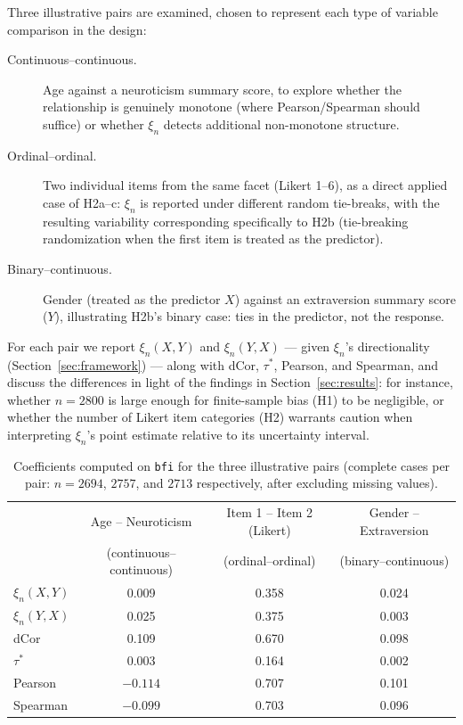 \documentclass[article]{ajs}
\begin{document}
Three illustrative pairs are examined, chosen to represent each type
of variable comparison in the design:

\begin{description}
\item[Continuous--continuous.] Age against a neuroticism summary
  score, to explore whether the relationship is genuinely monotone
  (where Pearson/Spearman should suffice) or whether $\xi_n$ detects
  additional non-monotone structure.
\item[Ordinal--ordinal.] Two individual items from the same facet
  (Likert 1--6), as a direct applied case of H2a--c: $\xi_n$ is
  reported under different random tie-breaks, with the resulting
  variability corresponding specifically to H2b (tie-breaking
  randomization when the first item is treated as the predictor).
\item[Binary--continuous.] Gender (treated as the predictor $X$)
  against an extraversion summary score ($Y$), illustrating H2b's
  binary case: ties in the predictor, not the response.
\end{description}

For each pair we report $\xi_n(X,Y)$ and $\xi_n(Y,X)$ --- given
$\xi_n$'s directionality (Section~\ref{sec:framework}) --- along with
dCor, $\tau^\ast$, Pearson, and Spearman, and discuss the differences
in light of the findings in Section~\ref{sec:results}: for instance,
whether $n=2800$ is large enough for finite-sample bias (H1) to be
negligible, or whether the number of Likert item categories (H2)
warrants caution when interpreting $\xi_n$'s point estimate relative
to its uncertainty interval.

\begin{table}[H]
\caption{\label{tab:realdata}Coefficients computed on \texttt{bfi} for the three illustrative pairs (complete cases per pair: $n=2694$, $2757$, and $2713$ respectively, after excluding missing values).}
\begin{center}
\small
\begin{tabular}{lccc}
\toprule
 & Age -- Neuroticism & Item 1 -- Item 2 (Likert) & Gender -- Extraversion \\
 & (continuous--continuous) & (ordinal--ordinal) & (binary--continuous) \\
\midrule
$\xi_n(X,Y)$ & 0.009 & 0.358 & 0.024 \\
$\xi_n(Y,X)$ & 0.025 & 0.375 & 0.003 \\
dCor         & 0.109 & 0.670 & 0.098 \\
$\tau^\ast$  & 0.003 & 0.164 & 0.002 \\
Pearson      & $-0.114$ & 0.707 & 0.101 \\
Spearman     & $-0.099$ & 0.703 & 0.096 \\
\bottomrule
\end{tabular}
\end{center}
\end{table}
\end{document}
